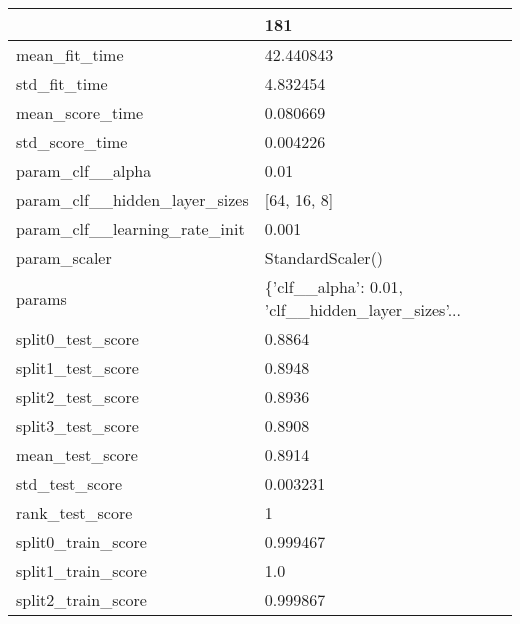 \begin{tabular}{ll}
\toprule
{} &                                                181 \\
\midrule
mean\_fit\_time                 &                                          42.440843 \\
std\_fit\_time                  &                                           4.832454 \\
mean\_score\_time               &                                           0.080669 \\
std\_score\_time                &                                           0.004226 \\
param\_clf\_\_alpha              &                                               0.01 \\
param\_clf\_\_hidden\_layer\_sizes &                                        [64, 16, 8] \\
param\_clf\_\_learning\_rate\_init &                                              0.001 \\
param\_scaler                  &                                   StandardScaler() \\
params                        &  \{'clf\_\_alpha': 0.01, 'clf\_\_hidden\_layer\_sizes'... \\
split0\_test\_score             &                                             0.8864 \\
split1\_test\_score             &                                             0.8948 \\
split2\_test\_score             &                                             0.8936 \\
split3\_test\_score             &                                             0.8908 \\
mean\_test\_score               &                                             0.8914 \\
std\_test\_score                &                                           0.003231 \\
rank\_test\_score               &                                                  1 \\
split0\_train\_score            &                                           0.999467 \\
split1\_train\_score            &                                                1.0 \\
split2\_train\_score            &                                           0.999867 \\

\end{tabular}
